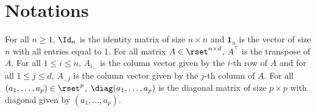 \section*{Notations}
\minitoc

For all $n\geq 1$, $\Id_n$ is the identity matrix of size $n\times n$  and $\mathbf{1}_n$ is the vector of size $n$ with all entries equal to 1. For all matrix $A\in\rset^{n\times d}$, $A^\top$ is the transpose of $A$. For all $1\leqslant i\leqslant n$, $A_{i,.}$ is the column vector given by the $i$-th row of $A$ and for all $1\leqslant j\leqslant d$, $A_{.,j}$ is the column vector given by the $j$-th column of $A$. For all $(a_1,\ldots,a_p)\in\rset^p$, $\diag(a_1,\ldots,a_p)$ is the diagonal matrix of size $p\times p$ with diagonal given by $(a_1,\ldots,a_p)$.